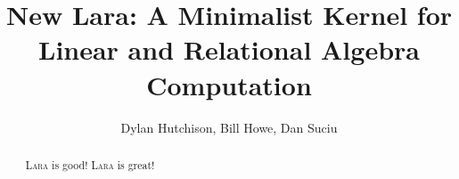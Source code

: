 \documentclass{sig-alternate} %
\newcommand{\lara}{\textsc{Lara}}%
\begin{document}





%


\title{New Lara: A Minimalist Kernel for \\ Linear and Relational Algebra Computation}

\author{
\alignauthor
	Dylan Hutchison, Bill Howe, Dan Suciu\\[3pt]
% 
}

% 

\maketitle
\begin{abstract}
\lara{} is good! \lara{} is great!
\end{abstract}
\end{document}
